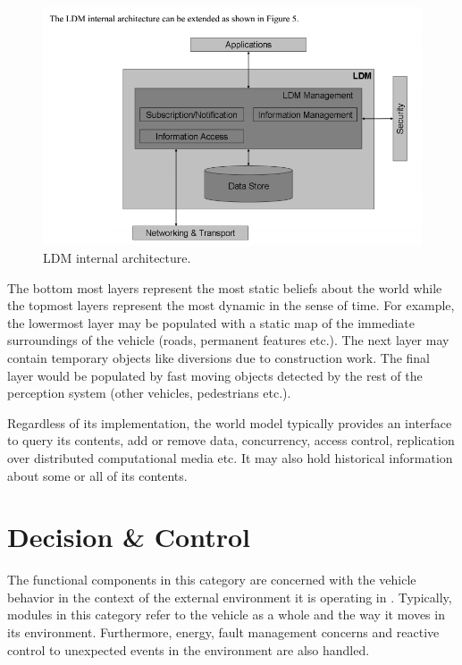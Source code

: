 \begin{figure}[!htb]
\begin{center}
\includegraphics[scale=0.380]{img/ldm_internal_architectuer.png}
\end{center}
\caption{LDM internal architecture.}
\label{ldm_internal_architectuer}
\end{figure}

The bottom most layers represent the most static beliefs about the world while the topmost layers represent the most dynamic in the sense of time. For example, the lowermost layer may be populated with a static map of the immediate surroundings of the vehicle (roads, permanent features etc.). The next layer may contain temporary objects
like diversions due to construction work. The final layer would be populated by fast moving objects detected by the rest of the perception system (other vehicles, pedestrians etc.)\cite{ETSITR102}. 

Regardless of its implementation, the world model typically provides an interface to query its contents, add or remove data, concurrency, access control, replication over distributed computational media etc. It may also hold historical information about some or all of its contents.  


\section{Decision \& Control}
The functional components in this category are concerned with the vehicle behavior 
in the context of the external environment it is operating in \cite{Bahere}. Typically, modules in this category refer to the vehicle as a whole and the way it
moves in its environment. Furthermore, energy, fault management concerns and reactive control to unexpected events in the environment are also handled. 

